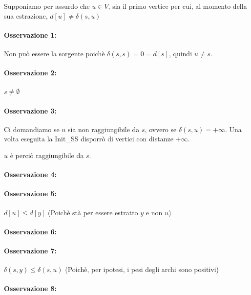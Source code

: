 \documentclass{article}
\let\oldparagraph\paragraph
\renewcommand{\paragraph}[1]{\oldparagraph{#1}\mbox{}}
\begin{document}
{{Supponiamo per assurdo che $u\in V$, sia il primo vertice per cui, al momento della sua estrazione, $d[u] \neq \delta(s,u)$}

\paragraph{Osservazione 1:}

{Non può essere la sorgente poichè $\delta(s,s)=0=d[s]$, quindi $u\neq s$.}

\paragraph{Osservazione 2:}

$s \neq \emptyset$

\paragraph{Osservazione 3:}

Ci domandiamo se $u$ sia non raggiungibile da $s$, ovvero se $\delta(s,u)=+\infty$.
Una volta eseguita la Init\_SS disporrò di vertici con distanze $+\infty$.

$u$ è perciò raggiungibile da $s$.

\paragraph{Osservazione 4:}

\paragraph{Osservazione 5:}

$d[u] \leq d[y]$ (Poichè stà per essere estratto $y$ e non $u$)

\paragraph{Osservazione 6:}

\paragraph{Osservazione 7:}

$\delta(s,y) \leq \delta(s,u)$ (Poichè, per ipotesi, i pesi degli archi sono positivi)

\paragraph{Osservazione 8:}

}
\end{document}
